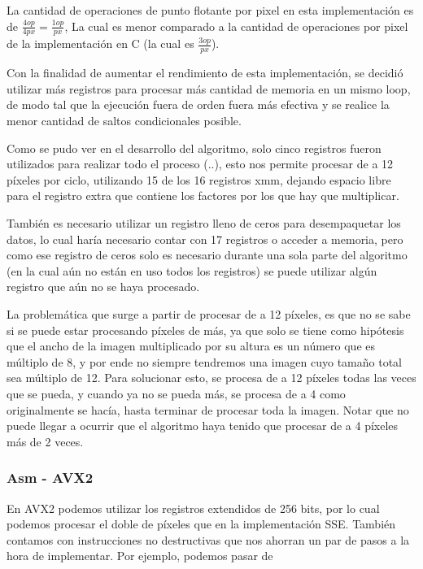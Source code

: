 La cantidad de operaciones de punto flotante por pixel en esta implementación es de $\frac{4op}{4px} = \frac{1op}{px}$, La cual es menor comparado a la cantidad de operaciones por pixel de la implementación en C (la cual es $\frac{3op}{px}$).

\vspace{2mm}

Con la finalidad de aumentar el rendimiento de esta implementación, se decidió utilizar más registros para procesar más cantidad de memoria en un mismo loop, de modo tal que la ejecución fuera de orden fuera más efectiva y se realice la menor cantidad de saltos condicionales posible.

Como se pudo ver en el desarrollo del algoritmo, solo cinco registros fueron utilizados para realizar todo el proceso (..), esto nos permite procesar de a 12 píxeles por ciclo, utilizando 15 de los 16 registros xmm, dejando espacio libre para el registro extra que contiene los factores por los que hay que multiplicar.

También es necesario utilizar un registro lleno de ceros para desempaquetar los datos, lo cual haría necesario contar con 17 registros o acceder a memoria, pero como ese registro de ceros solo es necesario durante una sola parte del algoritmo (en la cual aún no están en uso todos los registros) se puede utilizar algún registro que aún no se haya procesado.

La problemática que surge a partir de procesar de a 12 píxeles, es que no se sabe si se puede estar procesando píxeles de más, ya que solo se tiene como hipótesis que el ancho de la imagen multiplicado por su altura es un número que es múltiplo de 8, y por ende no siempre tendremos una imagen cuyo tamaño total sea múltiplo de 12. Para solucionar esto, se procesa de a 12 píxeles todas las veces que se pueda, y cuando ya no se pueda más, se procesa de a 4 como originalmente se hacía, hasta terminar de procesar toda la imagen. Notar que no puede llegar a ocurrir que el algoritmo haya tenido que procesar de a 4 píxeles más de 2 veces.

\subsubsection{Asm - AVX2}

En AVX2 podemos utilizar los registros extendidos \ymm{} de 256 bits, por lo cual podemos procesar el doble de píxeles que en la implementación SSE. También contamos con instrucciones no destructivas que nos ahorran un par de pasos a la hora de implementar. Por ejemplo, podemos pasar de

